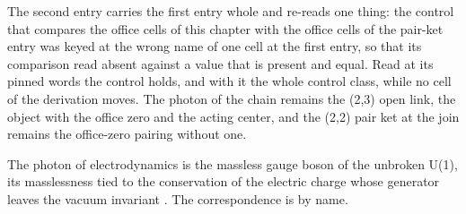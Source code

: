 The second entry carries the first entry whole and re-reads one thing: the control that compares the office cells of this chapter with the office cells of the pair-ket entry was keyed at the wrong name of one cell at the first entry, so that its comparison read absent against a value that is present and equal. Read at its pinned words the control holds, and with it the whole control class, while no cell of the derivation moves. The photon of the chain remains the (2,3) open link, the object with the office zero and the acting center, and the (2,2) pair ket at the join remains the office-zero pairing without one.
\begin{chbridge}
The photon of electrodynamics is the massless gauge boson of the unbroken U(1), its masslessness tied to the conservation of the electric charge whose generator leaves the vacuum invariant \cite{Peskin1995,Weinberg1995}. The correspondence is by name.
\end{chbridge}
